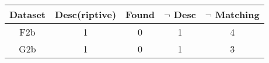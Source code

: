 \begin{tabular}{ccccc}
\toprule
Dataset & {Desc}(riptive) & Found & $\neg$ {Desc} & $\neg$
Matching\\
\midrule
F2b & 1 & 0 & 1 & 4 \\
G2b & 1 & 0 & 1 & 3 \\
\bottomrule
\end{tabular}
